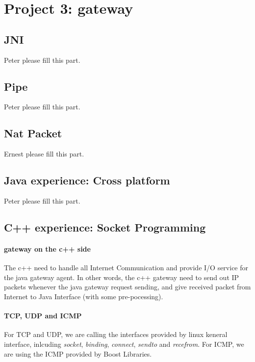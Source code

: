 \documentclass[conference,compsoc]{IEEEtran}
\begin{document}
\section{Project 3: gateway}

	
	\subsection{JNI}
		Peter please fill this part.
	
	\subsection{Pipe}
		Peter please fill this part.
		
	\subsection{Nat Packet}
		Ernest please fill this part.
	
	\subsection{Java experience: Cross platform}
		Peter please fill this part.

	\subsection{C++ experience: Socket Programming}
		\paragraph{\textbf{gateway on the c++ side}}
		The c++ need to handle all Internet Communication and provide I/O service for the java gateway agent. In other words, the c++ gateway need to send out IP packets whenever the java gateway request sending, and give received packet from Internet to Java Interface (with some pre-pocessing).
		
		
		\paragraph{\textbf{TCP, UDP and ICMP}}
		For TCP and UDP, we are calling the interfaces provided by linux keneral interface, inlcuding \emph{socket}, \emph{binding}, \emph{connect}, \emph{sendto} and \emph{recefrom}. For ICMP, we are using the ICMP provided by Boost Libraries. 
\end{document}
